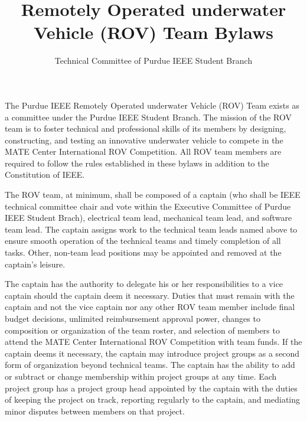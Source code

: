 \documentclass[12pt]{constitution}
\title{Remotely Operated underwater Vehicle (ROV) Team Bylaws}
\author{Technical Committee of Purdue IEEE Student Branch}
\date{}
\begin{document}

\titlecontentspage
\newpage


\label{art:preamble}

The Purdue IEEE Remotely Operated underwater Vehicle (ROV) Team exists as a committee under the Purdue IEEE Student Branch. The mission of the ROV team is to foster technical and professional skills of its members by designing, constructing, and testing an innovative underwater vehicle to compete in the MATE Center International ROV Competition. All ROV team members are required to follow the rules established in these bylaws in addition to the Constitution of IEEE.


\label{art:structmem}

The ROV team, at minimum, shall be composed of a captain (who shall be IEEE technical committee chair and vote within the Executive Committee of Purdue IEEE Student Brach), electrical team lead, mechanical team lead, and software team lead. The captain assigns work to the technical team leads named above to ensure smooth operation of the technical teams and timely completion of all tasks. Other, non-team lead positions may be appointed and removed at the captain's leisure.

The captain has the authority to delegate his or her responsibilities to a vice captain should the captain deem it necessary. Duties that must remain with the captain and not the vice captain nor any other ROV team member include final budget decisions, unlimited reimbursement approval power, changes to composition or organization of the team roster, and selection of members to attend the MATE Center International ROV Competition with team funds. If the captain deems it necessary, the captain may introduce project groups as a second form of organization beyond technical teams. The captain has the ability to add or subtract or change membership within project groups at any time. Each project group has a project group head appointed by the captain with the duties of keeping the project on track, reporting regularly to the captain, and mediating minor disputes between members on that project.
\end{document}
